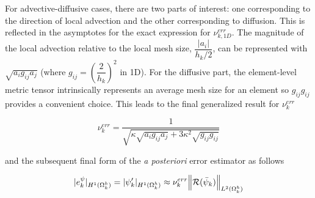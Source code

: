 


For advective-diffusive cases, there are two parts of interest: one corresponding to the direction of local advection and the other corresponding to diffusion.
This is reflected in the asymptotes for the exact expression for $\nu^{err}_{k,1D}$. %
The magnitude of the local advection relative to the local mesh size, $\dfrac{|a_i|}{h_k/2}$, can be represented with $\sqrt{a_i g_{ij} a_j}$ (where $g_{ij} = \left(\dfrac{2}{h_k}\right)^2$ in 1D).
For the diffusive part, the element-level metric tensor intrinsically represents an average mesh size for an element so $g_{ij}g_{ij}$ provides a convenient choice.
This leads to the final generalized result for $\nu^{err}_k$

\begin{equation}
    \nu^{err}_{k} = \dfrac{1}{\sqrt{ \kappa\sqrt{a_i g_{ij} a_j} + 3\kappa^2\sqrt{g_{ij}g_{ij}}  }  }
\end{equation}

\noindent and the subsequent final form of the \textit{a posteriori} error estimator as follows

\begin{equation}
      |e^{\psi}_k|_{H^{1}(\Omega^h_k)} = |\psi'_k|_{H^1(\Omega^h_k)} \approx \nu^{err}_{k} \norm{\mathcal{R}(\bar{\psi}_k)}_{L^2(\Omega^h_k)}
      \label{eq:VMSerr}
\end{equation}

